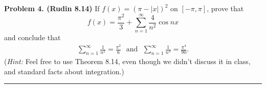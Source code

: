 \documentclass[leqno]{article}
\theoremstyle{nonumberplain}
\begin{document}


\noindent\textbf{Problem 4. (Rudin 8.14)} If $f(x)=(\pi-|x|)^2$ on $[-\pi,\pi]$, prove that
\[
f(x)=\frac{\pi^2}{3} + \sum_{n=1}^\infty \frac{4}{n^2} \cos nx
\]
and conclude that
\begin{align*}
\sum_{n=1}^\infty \frac{1}{n^2}=\frac{\pi^2}{6} \textrm{~~and~~} \sum_{n=1}^\infty \frac{1}{n^4} = \frac{\pi^4}{90}.
\end{align*}
(\emph{Hint:} Feel free to use Theorem 8.14, even though we didn't discuss it in class, and standard facts about integration.)

\noindent\rule[0.5ex]{\linewidth}{1pt}
\end{document}
